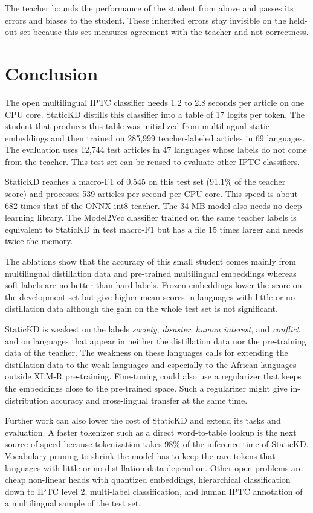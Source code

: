 \documentclass{ieeeaccess}
\begin{document}
The teacher bounds the performance of the student from above and passes its errors and biases to the student. These inherited errors stay invisible on the held-out set because this set measures agreement with the teacher and not correctness.

\section{Conclusion}
\label{sec:conclusion}
The open multilingual IPTC classifier needs 1.2 to 2.8 seconds per article on one CPU core. StaticKD distills this classifier into a table of 17 logits per token. The student that produces this table was initialized from multilingual static embeddings and then trained on 285,999 teacher-labeled articles in 69 languages. The evaluation uses 12,744 test articles in 47 languages whose labels do not come from the teacher. This test set can be reused to evaluate other IPTC classifiers.

StaticKD reaches a macro-F1 of 0.545 on this test set (91.1\% of the teacher score) and processes 539 articles per second per CPU core. This speed is about 682 times that of the ONNX int8 teacher. The 34-MB model also needs no deep learning library. The Model2Vec classifier trained on the same teacher labels is equivalent to StaticKD in test macro-F1 but has a file 15 times larger and needs twice the memory.

The ablations show that the accuracy of this small student comes mainly from multilingual distillation data and pre-trained multilingual embeddings whereas soft labels are no better than hard labels. Frozen embeddings lower the score on the development set but give higher mean scores in languages with little or no distillation data although the gain on the whole test set is not significant.

StaticKD is weakest on the labels \emph{society}, \emph{disaster}, \emph{human interest}, and \emph{conflict} and on languages that appear in neither the distillation data nor the pre-training data of the teacher. The weakness on these languages calls for extending the distillation data to the weak languages and especially to the African languages outside XLM-R pre-training. Fine-tuning could also use a regularizer that keeps the embeddings close to the pre-trained space. Such a regularizer might give in-distribution accuracy and cross-lingual transfer at the same time.

Further work can also lower the cost of StaticKD and extend its tasks and evaluation. A faster tokenizer such as a direct word-to-table lookup is the next source of speed because tokenization takes 98\% of the inference time of StaticKD. Vocabulary pruning to shrink the model has to keep the rare tokens that languages with little or no distillation data depend on. Other open problems are cheap non-linear heads with quantized embeddings, hierarchical classification down to IPTC level 2, multi-label classification, and human IPTC annotation of a multilingual sample of the test set.
\end{document}
